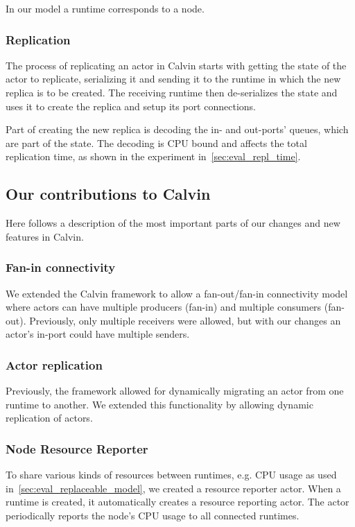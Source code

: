\documentclass{cslthse-msc}
\begin{document}
In our model a runtime corresponds to a node.

\subsubsection{Replication} \label{subsec:calvin_replication}
The process of replicating an actor in Calvin starts with getting the state of the actor to replicate, serializing it and sending it to the runtime in which the new replica is to be created. The receiving runtime then de-serializes the state and uses it to create the replica and setup its port connections.

Part of creating the new replica is decoding the in- and out-ports' queues, which are part of the state. The decoding is CPU bound and affects the total replication time, as shown in the experiment in~\cref{sec:eval_repl_time}.

\subsection{Our contributions to Calvin} \label{subsec:design_contributions} %
Here follows a description of the most important parts of our changes and new features in Calvin.

\subsubsection{Fan-in connectivity}
We extended the Calvin framework to allow a fan-out/fan-in connectivity model where actors can have multiple producers (fan-in) and multiple consumers (fan-out). Previously, only multiple receivers were allowed, but with our changes an actor's in-port could have multiple senders.

\subsubsection{Actor replication}
Previously, the framework allowed for dynamically migrating an actor from one runtime to another. We extended this functionality by allowing dynamic replication of actors. 

\subsubsection{Node Resource Reporter}
To share various kinds of resources between runtimes, e.g. CPU usage as used in~\cref{sec:eval_replaceable_model}, we created a resource reporter actor. When a runtime is created, it automatically creates a resource reporting actor. The actor periodically reports the node's CPU usage to all connected runtimes. 
\end{document}
